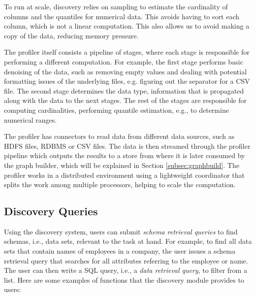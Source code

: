 
To run at scale, discovery relies on sampling to estimate the cardinality of
columns and the quantiles for numerical data. This avoids having to sort each
column, which is not a linear computation.  This also allows us to avoid making a copy of
the data,  reducing memory pressure.

The profiler itself consists a pipeline of stages, where each stage is
responsible for performing a different computation. For example, the first stage
performs basic denoising of the data, such as removing empty values and dealing
with potential formatting issues of the underlying files, e.g. figuring out the
separator for a CSV file.  The second stage determines the data type,
information that is propagated along with the data to the next stages. The rest
of the stages are responsible for computing cardinalities, performing quantile
estimation, e.g., to determine numerical ranges.

The profiler has connectors to read data from different data sources, such as
HDFS files, RDBMS or CSV files. The data is then streamed through the profiler
pipeline which outputs the results
to a store from where it is later consumed by the graph builder, which will be
explained in Section \ref{subsec:graphbuild}.
The profiler works in a distributed environment using a lightweight coordinator
that splits the work among multiple processors, helping to scale the
computation.



\subsection{Discovery Queries}
\label{subsec:api}

Using the discovery system, users can submit \emph{schema retrieval queries}
to find schemas, i.e., data sets, relevant to the task at hand. 
For example, to find all data sets that contain names of
employees in a company, the user issues a schema retrieval query that searches for all
attributes referring to the employee or name.
The user can then write a SQL query, i.e., a \emph{data retrieval query}, to filter from a list. 
Here are some examples of functions that the discovery module provides to users:

